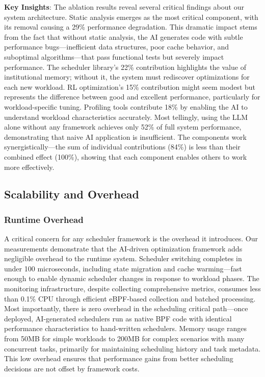 \textbf{Key Insights}: The ablation results reveal several critical findings about our system architecture. Static analysis emerges as the most critical component, with its removal causing a 29\% performance degradation. This dramatic impact stems from the fact that without static analysis, the AI generates code with subtle performance bugs—inefficient data structures, poor cache behavior, and suboptimal algorithms—that pass functional tests but severely impact performance. The scheduler library's 22\% contribution highlights the value of institutional memory; without it, the system must rediscover optimizations for each new workload. RL optimization's 15\% contribution might seem modest but represents the difference between good and excellent performance, particularly for workload-specific tuning. Profiling tools contribute 18\% by enabling the AI to understand workload characteristics accurately. Most tellingly, using the LLM alone without any framework achieves only 52\% of full system performance, demonstrating that naive AI application is insufficient. The components work synergistically—the sum of individual contributions (84\%) is less than their combined effect (100\%), showing that each component enables others to work more effectively.

\subsection{Scalability and Overhead}

\subsubsection{Runtime Overhead}
A critical concern for any scheduler framework is the overhead it introduces. Our measurements demonstrate that the AI-driven optimization framework adds negligible overhead to the runtime system. Scheduler switching completes in under 100 microseconds, including state migration and cache warming—fast enough to enable dynamic scheduler changes in response to workload phases. The monitoring infrastructure, despite collecting comprehensive metrics, consumes less than 0.1\% CPU through efficient eBPF-based collection and batched processing. Most importantly, there is zero overhead in the scheduling critical path—once deployed, AI-generated schedulers run as native BPF code with identical performance characteristics to hand-written schedulers. Memory usage ranges from 50MB for simple workloads to 200MB for complex scenarios with many concurrent tasks, primarily for maintaining scheduling history and task metadata. This low overhead ensures that performance gains from better scheduling decisions are not offset by framework costs.

